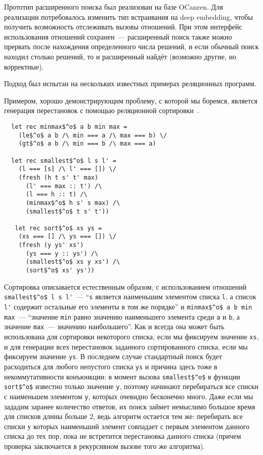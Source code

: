     Прототип расширенного поиска был реализован на базе OCanren. Для реализации потребовалось изменить тип встраивания на deep embedding, чтобы получить возможность отслеживать вызовы отношений. При этом интерфейс использования отношений сохранен~--- расширенный поиск также можно прервать после нахождения определенного числа решений, и если обычный поиск находил столько решений, то и расширенный найдёт (возможно другие, но корректные).

    Подход был испытан на нескольких известных примерах реляционных программ.
    
    Примером, хорошо демонстрирующим проблему, с которой мы боремся, является генерация перестановок с помощью реляционной сортировки~\cite{ocanren}.
    
\begin{lstlisting}
  let rec minmax$^o$ a b min max =
    (le$^o$ a b /\ min === a /\ max === b) \/
    (gt$^o$ a b /\ min === b /\ max === a)
  
  let rec smallest$^o$ l s l' =
    (l === [s] /\ l' === []) \/
    (fresh (h t s' t' max)
      (l' === max :: t') /\
      (l === h :: t) /\
      (minmax$^o$ h s' s max) /\
      (smallest$^o$ t s' t'))
   
   let rec sort$^o$ xs ys =
    (xs === [] /\ ys === []) \/
    (fresh (y ys' xs')
      (ys === y :: ys') /\
      (smallest$^o$ xs y xs') /\
      (sort$^o$ xs' ys'))
\end{lstlisting}

    Сортировка описывается естественным образом, с использованием отношений \lstinline|smallest$^o$ l s l'|~--- ``\lstinline|s| является наименьшим элементом списка \lstinline|l|, а список \lstinline|l'| содержит остальные его элементы в том же порядке'' и \lstinline|minmax$^o$ a b min max|~--- ``значение \lstinline|min| равно значению наименьшего элемента среди \lstinline|a| и \lstinline|b|, а значение \lstinline|max|~--- значению наибольшего''. Как и всегда она может быть использована для сортировки некоторого списка, если мы фиксируем значение \lstinline|xs|, и для генерации всех перестановок заданного сортированного списка, если мы фиксируем значение \lstinline|ys|. В последнем случае стандартный поиск будет расходиться для любого непустого списка \lstinline|ys| и причина здесь тоже в некоммутативности конъюнкции: в момент вызова \lstinline|smallest$^o$| в функции \lstinline|sort$^o$| известно только значение \lstinline|y|, поэтому начинают перебираться все списки с наименьшем элементом \lstinline|y|, которых очевидно бесконечно много. Даже если мы зададим заранее количество ответов, их поиск займет немыслимо большое время для списков длины больше $2$, ведь алгоритм остается тем же: перебирать все списки у которых наименьший элемент совпадает с первым элементом данного списка до тех пор, пока не встретится перестановка данного списка (причем проверка заключается в рекурсивном вызове того же алгоритма).
  
